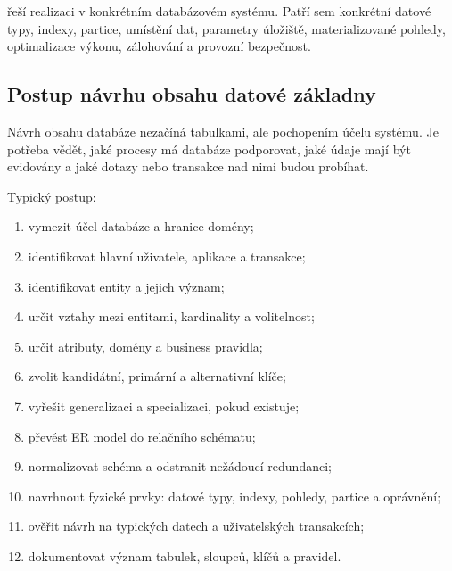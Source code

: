  řeší realizaci v konkrétním databázovém systému. Patří sem konkrétní datové typy,
indexy, partice, umístění dat, parametry úložiště, materializované pohledy, optimalizace výkonu,
zálohování a provozní bezpečnost.

\subsection{Postup návrhu obsahu datové základny}
Návrh obsahu databáze nezačíná tabulkami, ale pochopením účelu systému. Je potřeba vědět, jaké procesy
má databáze podporovat, jaké údaje mají být evidovány a jaké dotazy nebo transakce nad nimi budou
probíhat.

Typický postup:
\begin{enumerate}
  \item vymezit účel databáze a hranice domény;
  \item identifikovat hlavní uživatele, aplikace a transakce;
  \item identifikovat entity a jejich význam;
  \item určit vztahy mezi entitami, kardinality a volitelnost;
  \item určit atributy, domény a business pravidla;
  \item zvolit kandidátní, primární a alternativní klíče;
  \item vyřešit generalizaci a specializaci, pokud existuje;
  \item převést ER model do relačního schématu;
  \item normalizovat schéma a odstranit nežádoucí redundanci;
  \item navrhnout fyzické prvky: datové typy, indexy, pohledy, partice a oprávnění;
  \item ověřit návrh na typických datech a uživatelských transakcích;
  \item dokumentovat význam tabulek, sloupců, klíčů a pravidel.
\end{enumerate}

